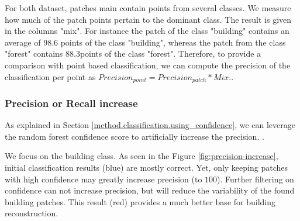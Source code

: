 		For both dataset, patches main contain points from several classes. We measure how much of the patch points pertain to the dominant class. The result is given in the columns "mix". For instance the patch of the class "building" contains an average of 98.6 \mypercent points of the class "building", whereas the patch from the class "forest" contains 88.3\mypercent points of the class "forest".
		Therefore, to provide a comparison with point based classification, we can compute the precision of the classification per point as $Precision_{point} = Precision_{patch} * Mix.$.
		
		\subsubsection{Precision or Recall increase} 
		
		As explained in Section \ref{method.classification.using_confidence}, we can leverage the random forest confidence score to artificially increase the precision.
		.
		
		We focus on the building class.
		As seen in the Figure \ref{fig:precision-increase}, initial classification results (blue) are mostly correct.
		Yet, only keeping patches with high confidence may greatly increase precision (to $100$\mypercent).
		Further filtering on confidence can not increase precision, but will reduce the variability of the found building patches. 
		This result (red) provides a much better base for building reconstruction. 
				


